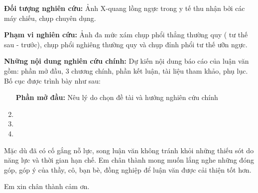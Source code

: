 \textbf{Đối tượng nghiên cứu:} Ảnh X-quang lồng ngực trong y tế thu nhận bởi các máy chiếu, chụp chuyên dụng.

\textbf{Phạm vi nghiên cứu:} Ảnh đa mức xám chụp phổi thẳng thường quy ( tư thế sau - trước), chụp phổi nghiêng thường quy và chụp đỉnh phổi tư thế ưỡn ngực.

\textbf{Những nội dung nghiên cứu chính:} Dự kiến nội dung báo cáo của luận văn gồm: phần mở đầu, 3 chương chính, phần kết luận, tài liệu tham khảo, phụ lục. Bố cục được trình bày như sau:

\begin{enumerate}[label=\bfseries Chương \arabic*:]
	\item[\bfseries Phần mở đầu:] Nêu lý do chọn đề tài và hướng nghiên cứu chính
	\item \tenchuongi 
	\item \tenchuongii
	\item \tenchuongiii
\end{enumerate}

Mặc dù đã có cố gắng nỗ lực, song luận văn không tránh khỏi những thiếu sót do năng lực và thời gian hạn chế. Em chân thành mong muốn lắng nghe những đóng góp, góp ý của thầy, cô, bạn bè, đồng nghiệp để luận văn được cải thiện tốt hơn.

Em xin chân thành cảm ơn.
